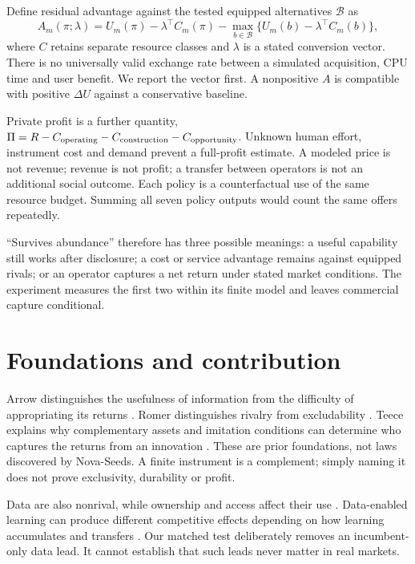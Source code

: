 Define residual advantage against the tested equipped alternatives $\mathcal B$ as
\begin{equation}
A_m(\pi;\lambda)=U_m(\pi)-\lambda^\top C_m(\pi)
-\max_{b\in\mathcal B}\{U_m(b)-\lambda^\top C_m(b)\},
\end{equation}
where $C$ retains separate resource classes and $\lambda$ is a stated conversion vector. There is no universally valid exchange rate between a simulated acquisition, CPU time and user benefit. We report the vector first. A nonpositive $A$ is compatible with positive $\Delta U$ against a conservative baseline.

Private profit is a further quantity, $\Pi=R-C_{\rm operating}-C_{\rm construction}-C_{\rm opportunity}$. Unknown human effort, instrument cost and demand prevent a full-profit estimate. A modeled price is not revenue; revenue is not profit; a transfer between operators is not an additional social outcome. Each policy is a counterfactual use of the same resource budget. Summing all seven policy outputs would count the same offers repeatedly.

``Survives abundance'' therefore has three possible meanings: a useful capability still works after disclosure; a cost or service advantage remains against equipped rivals; or an operator captures a net return under stated market conditions. The experiment measures the first two within its finite model and leaves commercial capture conditional.

\section{Foundations and contribution}
Arrow distinguishes the usefulness of information from the difficulty of appropriating its returns \citep{arrow1962}. Romer distinguishes rivalry from excludability \citep{romer1990}. Teece explains why complementary assets and imitation conditions can determine who captures the returns from an innovation \citep{teece1986}. These are prior foundations, not laws discovered by Nova-Seeds. A finite instrument is a complement; simply naming it does not prove exclusivity, durability or profit.

Data are also nonrival, while ownership and access affect their use \citep{jonestonetti2020}. Data-enabled learning can produce different competitive effects depending on how learning accumulates and transfers \citep{hagiuwright2023}. Our matched test deliberately removes an incumbent-only data lead. It cannot establish that such leads never matter in real markets.

